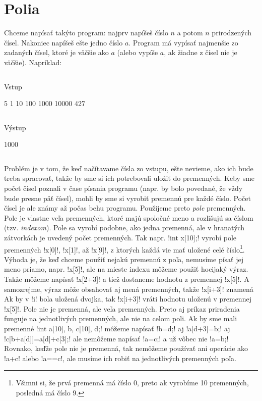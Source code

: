\chapter{Polia}

Chceme napísať takýto program: najprv napíšeš číslo $n$ a potom $n$ prirodzených 
čísel. Nakoniec napíšeš ešte jedno číslo $a$. Program má vypísať najmenšie zo zadaných čísel,
ktoré je väčšie ako $a$ (alebo vypíše $a$, ak žiadne z čísel nie je väčšie). 
Napríklad:

\vspace*{-2ex}
\begin{column}{0.45}
Vstup\\
\begin{outputBox}
5
1 10 100 1000 10000
427
\end{outputBox}
\end{column}
\hfill
\begin{column}{0.45}
Výstup\\
\begin{outputBox}
1000
\end{outputBox}
\end{column}


Problém je v tom, že keď načítavame čísla zo vstupu, ešte nevieme, ako ich bude treba 
spracovať, takže by sme si ich potrebovali uložiť do premenných. Keby sme počet čísel
poznali v čase písania programu (napr. by bolo povedané, že vždy bude presne päť čísel),
mohli by sme si vyrobiť premennú pre každé číslo. Počet čísel je ale známy až počas behu 
programu. 
Použijeme preto {\em pole} premenných. Pole je vlastne veľa premenných, ktoré
majú spoločné meno a rozlišujú sa číslom (tzv. {\em indexom}). Pole sa vyrobí podobne,
ako jedna premenná, ale v hranatých zátvorkách je uvedený počet premenných.
Tak napr. \prg!int x[10];! vyrobí pole premenných \prg!x[0]!, \prg!x[1]!, až
\prg!x[9]!, z ktorých každá vie mať uložené celé číslo\footnote{Všimni si, že prvá premenná
má číslo 0, preto ak vyrobíme 10 premenných, posledná má číslo 9.}.
Výhoda je, že keď chceme použiť nejakú premennú z poľa, nemusíme písať jej meno priamo,
napr. \prg!x[5]!, ale na mieste indexu môžeme použiť hocijaký výraz. Takže môžeme
napísať \prg!x[2+3]! a tiež dostaneme hodnotu z premennej \prg!x[5]!. A samozrejme,
výraz môže obsahovať aj mená premenných, takže \prg!x[i+3]! znamená  Ak by v \prg!i! bola uložená dvojka, tak \prg!x[i+3]! vráti hodnotu
uloženú v premennej \prg!x[5]!. 
Pole nie je premenná, ale veľa premenných. Preto aj príkaz priradenia funguje
na jednotlivých premenných, ale nie na celom poli. Ak by sme mali premenné
\prg!int a[10], b, c[10], d;! môžeme napísať \prg!b=d;! aj \prg!a[d+3]=b;! aj
\prg!c[b+a[d]]=a[d]+c[3];! ale nemôžeme napísať \prg!a=c;! a už vôbec nie
\prg!a=b;! Rovnako, keďže pole nie je premenná, tak nemôžeme používať ani
operácie ako \prg!a+c! alebo \prg!a==c!, ale musíme ich robiť na jednotlivých premenných 
poľa.

